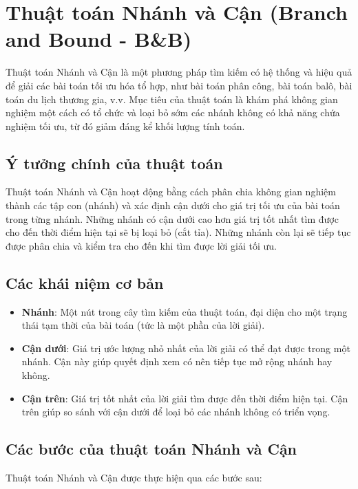 \section{Thuật toán Nhánh và Cận (Branch and Bound - B\&B)}

Thuật toán Nhánh và Cận là một phương pháp tìm kiếm có hệ thống và hiệu quả để giải các bài toán tối ưu hóa tổ hợp, như bài toán phân công, bài toán balô, bài toán du lịch thương gia, v.v. Mục tiêu của thuật toán là khám phá không gian nghiệm một cách có tổ chức và loại bỏ sớm các nhánh không có khả năng chứa nghiệm tối ưu, từ đó giảm đáng kể khối lượng tính toán.

\subsection{Ý tưởng chính của thuật toán}

Thuật toán Nhánh và Cận hoạt động bằng cách phân chia không gian nghiệm thành các tập con (nhánh) và xác định cận dưới cho giá trị tối ưu của bài toán trong từng nhánh. Những nhánh có cận dưới cao hơn giá trị tốt nhất tìm được cho đến thời điểm hiện tại sẽ bị loại bỏ (cắt tỉa). Những nhánh còn lại sẽ tiếp tục được phân chia và kiểm tra cho đến khi tìm được lời giải tối ưu.

\subsection{Các khái niệm cơ bản}

\begin{itemize}
    \item \textbf{Nhánh}: Một nút trong cây tìm kiếm của thuật toán, đại diện cho một trạng thái tạm thời của bài toán (tức là một phần của lời giải).
    \item \textbf{Cận dưới}: Giá trị ước lượng nhỏ nhất của lời giải có thể đạt được trong một nhánh. Cận này giúp quyết định xem có nên tiếp tục mở rộng nhánh hay không.
    \item \textbf{Cận trên}: Giá trị tốt nhất của lời giải tìm được đến thời điểm hiện tại. Cận trên giúp so sánh với cận dưới để loại bỏ các nhánh không có triển vọng.
\end{itemize}

\subsection{Các bước của thuật toán Nhánh và Cận}

Thuật toán Nhánh và Cận được thực hiện qua các bước sau:

